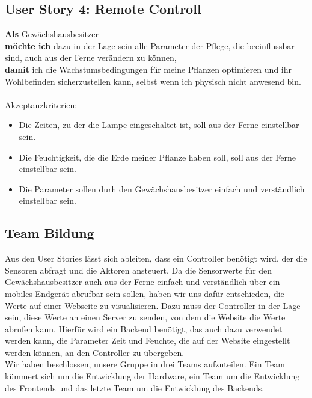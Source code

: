 \subsection{User Story 4: Remote Controll}
\textbf{Als} Gewächshausbesitzer\\
\textbf{möchte ich} dazu in der Lage sein alle Parameter der Pflege, die beeinflussbar sind, auch aus der Ferne verändern zu können,\\
\textbf{damit} ich die Wachstumsbedingungen für meine Pflanzen optimieren und ihr Wohlbefinden sicherzustellen kann, selbst wenn ich physisch nicht anwesend bin.
\\ \\
Akzeptanzkriterien: 
\begin{itemize}
    \item Die Zeiten, zu der die Lampe eingeschaltet ist, soll aus der Ferne einstellbar sein.
    \item Die Feuchtigkeit, die die Erde meiner Pflanze haben soll, soll aus der Ferne einstellbar sein. 
    \item Die Parameter sollen durh den Gewächshausbesitzer einfach und verständlich einstellbar sein. 
\end{itemize}


\subsection{Team Bildung}
Aus den User Stories lässt sich ableiten, dass ein Controller benötigt wird, der die Sensoren abfragt und die Aktoren ansteuert.
Da die Sensorwerte für den Gewächshausbesitzer auch aus der Ferne einfach und verständlich über ein mobiles Endgerät abrufbar sein sollen, haben wir uns dafür entschieden, die Werte auf einer Webseite zu visualisieren. 
Dazu muss der Controller in der Lage sein, diese Werte an einen Server zu senden, von dem die Website die Werte abrufen kann. 
Hierfür wird ein Backend benötigt, das auch dazu verwendet werden kann, die Parameter Zeit und Feuchte, die auf der Website eingestellt werden können, an den Controller zu übergeben.
\\
Wir haben beschlossen, unsere Gruppe in drei Teams aufzuteilen. 
Ein Team kümmert sich um die Entwicklung der Hardware, ein Team um die Entwicklung des Frontends und das letzte Team um die Entwicklung des Backends.
\pagebreak